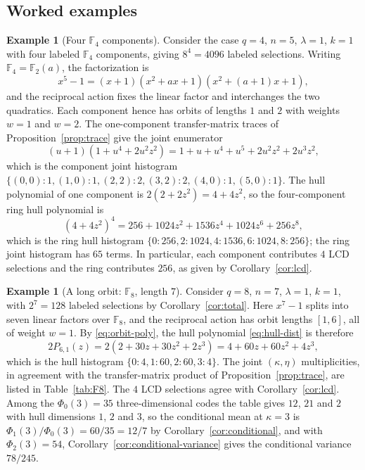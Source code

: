 \documentclass[10pt,a4paper]{article}
\newcommand{\F}{\mathbb F}
\numberwithin{equation}{section}
\theoremstyle{plain}
\theoremstyle{definition}
\newtheorem{example}[theorem]{Example}
\theoremstyle{remark}
\begin{document}
\subsection{Worked examples}\label{sec:worked}

\begin{example}[Four \texorpdfstring{$\F_4$}{F4} components]\label{ex:pilot}
Consider the case $q=4$, $n=5$, $\lambda=1$, $k=1$ with four labeled $\F_4$
components, giving $8^4=4096$ labeled selections. Writing $\F_4=\F_2(a)$, the
factorization is
\[
x^5-1=(x+1)(x^2+ax+1)(x^2+(a+1)x+1),
\]
and the reciprocal action fixes the linear factor and interchanges the two
quadratics. Each component hence has orbits of lengths $1$ and $2$ with weights
$w=1$ and $w=2$. The one-component transfer-matrix traces of
Proposition~\ref{prop:trace} give the joint enumerator
\[
(u+1)(1+u^4+2u^2z^2)=1+u+u^4+u^5+2u^2z^2+2u^3z^2,
\]
which is the component joint histogram
$\{(0,0):1,(1,0):1,(2,2):2,(3,2):2,(4,0):1,(5,0):1\}$. The hull polynomial of one
component is $2(2+2z^2)=4+4z^2$, so the four-component ring hull polynomial is
\[
(4+4z^2)^4=256+1024z^2+1536z^4+1024z^6+256z^8,
\]
which is the ring hull histogram $\{0:256,2:1024,4:1536,6:1024,8:256\}$; the
ring joint histogram has $65$ terms. In particular, each component contributes
$4$ LCD selections and the ring contributes $256$, as given by
Corollary~\ref{cor:lcd}.
\end{example}

\begin{example}[A long orbit: \texorpdfstring{$\F_8$}{F8}, length \texorpdfstring{$7$}{7}]\label{ex:long-orbit}
Consider $q=8$, $n=7$, $\lambda=1$, $k=1$, with $2^7=128$ labeled selections by
Corollary~\ref{cor:total}. Here $x^7-1$ splits into seven linear factors over
$\F_8$, and the reciprocal action has orbit lengths $[1,6]$, all of weight $w=1$.
By \eqref{eq:orbit-poly}, the hull polynomial \eqref{eq:hull-dist} is therefore
\[
2P_{6,1}(z)=2(2+30z+30z^2+2z^3)=4+60z+60z^2+4z^3,
\]
which is the hull histogram $\{0:4,1:60,2:60,3:4\}$. The joint $(\kappa,\eta)$
multiplicities, in agreement with the transfer-matrix product of
Proposition~\ref{prop:trace}, are listed in Table~\ref{tab:F8}. The
$4$ LCD selections agree with Corollary~\ref{cor:lcd}. Among the
$\Phi_0(3)=35$ three-dimensional codes the table gives $12$, $21$ and $2$ with
hull dimensions $1$, $2$ and $3$, so the conditional mean at $\kappa=3$ is
$\Phi_1(3)/\Phi_0(3)=60/35=12/7$ by Corollary~\ref{cor:conditional}, and with
$\Phi_2(3)=54$, Corollary~\ref{cor:conditional-variance} gives the conditional
variance $78/245$.
\end{example}
\end{document}
